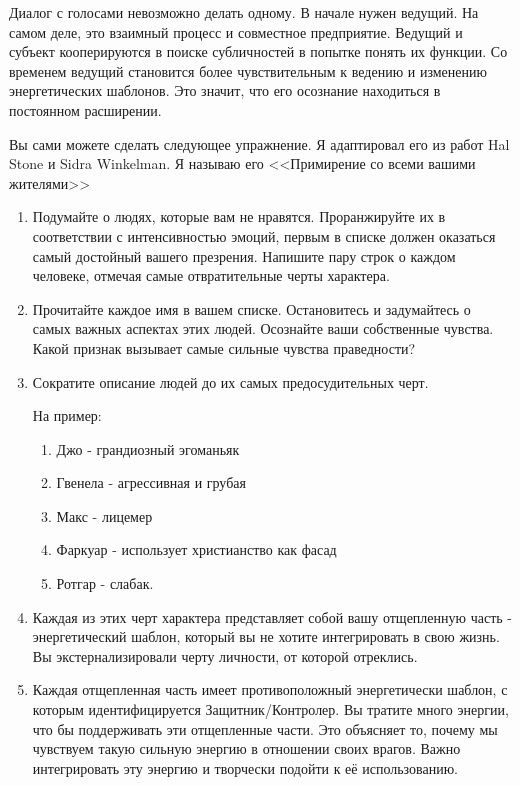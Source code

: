 \documentclass[10pt, fleqn]{article}
\begin{document}
\begin{enumerate}
Диалог с голосами невозможно делать одному. В начале нужен ведущий. На самом деле, это взаимный процесс и совместное предприятие. Ведущий и субъект кооперируются в поиске субличностей в попытке понять их функции. Со временем ведущий становится более чувствительным к ведению и изменению энергетических шаблонов. Это значит, что его осознание находиться в постоянном расширении.

Вы сами можете сделать следующее упражнение. Я адаптировал его из работ Hal Stone и Sidra Winkelman. Я называю его <<Примирение со всеми вашими жителями>>

\end{enumerate}



\begin{enumerate}
\item Подумайте о людях, которые вам не нравятся. Проранжируйте их в соответствии с интенсивностью эмоций, первым в списке должен оказаться самый достойный вашего презрения. Напишите пару строк о каждом человеке, отмечая самые отвратительные черты характера.

\item Прочитайте каждое имя в вашем списке. Остановитесь и задумайтесь о самых важных аспектах этих людей. Осознайте ваши собственные чувства. Какой признак вызывает самые сильные чувства праведности?

\item Сократите описание людей до их самых предосудительных черт. 

На пример:
\begin{enumerate}
\item Джо - грандиозный эгоманьяк
\item Гвенела - агрессивная и грубая
\item Макс - лицемер
\item Фаркуар - использует христианство как фасад
\item Ротгар - слабак.
\end{enumerate}

\item Каждая из этих черт характера представляет собой вашу отщепленную часть - энергетический шаблон, который вы не хотите интегрировать в свою жизнь. Вы экстернализировали черту личности, от которой отреклись.

\item Каждая отщепленная часть имеет противоположный энергетически шаблон, с которым идентифицируется Защитник/Контролер. Вы тратите много энергии, что бы поддерживать эти отщепленные части. Это объясняет то, почему мы чувствуем такую сильную энергию в отношении своих врагов. Важно интегрировать эту энергию и творчески подойти к её использованию.


\end{enumerate}
\end{document}

